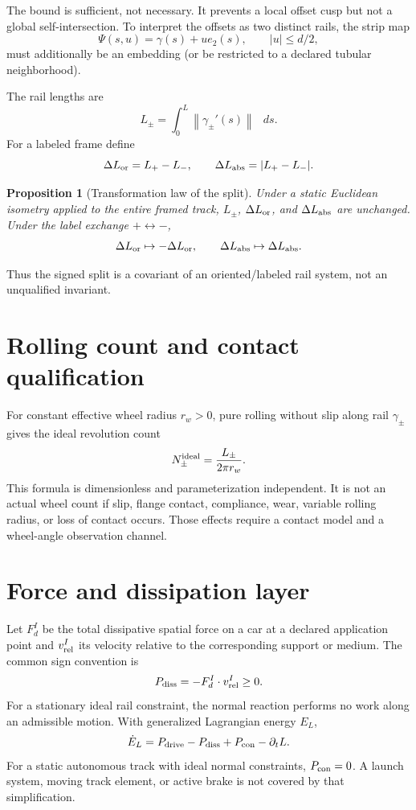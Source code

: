 \documentclass[11pt,a4paper]{article}
\theoremstyle{definition}
\theoremstyle{plain}
\newtheorem{proposition}[definition]{Proposition}
\theoremstyle{remark}
\newcommand{\dd}{\mathop{}\!d}
\newcommand{\norm}[1]{\left\lVert #1\right\rVert}
\begin{document}
The bound is sufficient, not necessary. It prevents a local offset
cusp but not a global self-intersection. To interpret the offsets as
two distinct rails, the strip map
\[
\Psi(s,u)=\gamma(s)+u e_2(s),
\qquad |u|\le d/2,
\]
must additionally be an embedding (or be restricted to a declared
tubular neighborhood).

The rail lengths are
\[
L_\pm=\int_0^L\norm{\gamma_\pm'(s)}\,\dd s.
\]
For a labeled frame define
\[
\Delta L_{\rm or}=L_+-L_-,
\qquad
\Delta L_{\rm abs}=\lvert L_+-L_-\rvert.
\]

\begin{proposition}[Transformation law of the split]
Under a static Euclidean isometry applied to the entire framed track,
\(L_\pm\), \(\Delta L_{\rm or}\), and
\(\Delta L_{\rm abs}\) are unchanged. Under the label exchange
\(+\leftrightarrow-\),
\[
\Delta L_{\rm or}\mapsto-\Delta L_{\rm or},
\qquad
\Delta L_{\rm abs}\mapsto\Delta L_{\rm abs}.
\]
\end{proposition}

Thus the signed split is a covariant of an oriented/labeled rail
system, not an unqualified invariant.

\section{Rolling count and contact qualification}

For constant effective wheel radius \(r_w>0\), pure rolling without
slip along rail \(\gamma_\pm\) gives the ideal revolution count
\[
N_\pm^{\rm ideal}=\frac{L_\pm}{2\pi r_w}.
\]
This formula is dimensionless and parameterization independent. It is
not an actual wheel count if slip, flange contact, compliance, wear,
variable rolling radius, or loss of contact occurs. Those effects
require a contact model and a wheel-angle observation channel.

\section{Force and dissipation layer}

Let \(F_d^I\) be the total dissipative spatial force on a car at a
declared application point and \(v_{\rm rel}^I\) its velocity relative
to the corresponding support or medium. The common sign convention is
\[
P_{\rm diss}=-F_d^I\cdot v_{\rm rel}^I\ge0.
\]
For a stationary ideal rail constraint, the normal reaction performs
no work along an admissible motion. With generalized Lagrangian energy
\(E_L\),
\[
\dot E_L
=P_{\rm drive}-P_{\rm diss}+P_{\rm con}-\partial_tL.
\]
For a static autonomous track with ideal normal constraints,
\(P_{\rm con}=0\). A launch system, moving track element, or active
brake is not covered by that simplification.
\end{document}
